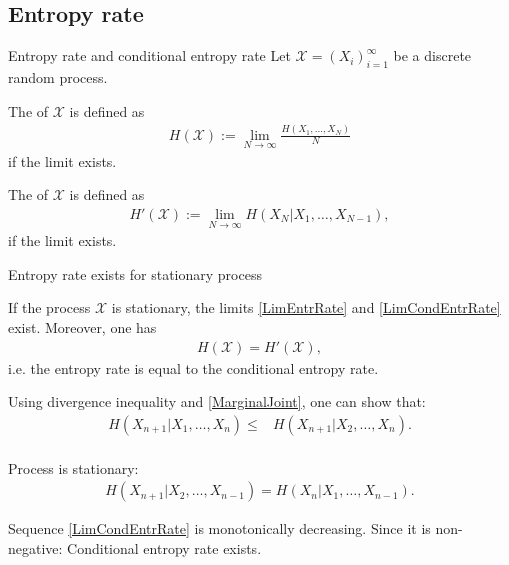 \subsection{Entropy rate}
\begin{frame}{Entropy rate and conditional entropy rate}
Let $\mathcal{X}=\left(X_i\right)_{i=1}^\infty$ be a discrete random process.
\bit
\item The   of $\mathcal{X}$ is 
defined as 
\begin{align}\label{LimEntrRate}
H(\mathcal{X}):=\lim_{N\to\infty}\frac{H\left(X_1,\dots,X_N\right)}{N}
\end{align}
if the limit exists.
\item The  of $\mathcal{X}$ is 
defined as 
\begin{align}\label{LimCondEntrRate}
H'(\mathcal{X}):=\lim_{N\to\infty}H\left(X_N|X_1,\dots,X_{N-1}\right),
\end{align}
if the limit exists.
\eit
\end{frame}

\begin{frame}{Entropy rate exists for stationary process}
\begin{theorem}
If the process $\mathcal{X}$ is stationary, the limits \eqref{LimEntrRate} and \eqref{LimCondEntrRate} exist. Moreover, one has
\begin{align*}
H(\mathcal{X})=H'(\mathcal{X}),
\end{align*}
i.e. the entropy rate is equal to the conditional entropy rate.
\end{theorem}
\bit
\item Using divergence inequality and \eqref{MarginalJoint}, one can show that: 
\begin{align*}
H(X_{n+1}|X_1,\dots,X_n)\leq &H(X_{n+1}|X_2,\dots,X_{n}).\\
\end{align*}
\item Process is stationary: 
\begin{align*}
H(X_{n+1}|X_2,\dots,X_{n-1})=H(X_{n}|X_1,\dots,X_{n-1}).
\end{align*}
\item [\iarrow] Sequence \eqref{LimCondEntrRate} is monotonically decreasing. Since it is non-negative: Conditional entropy rate exists. 
\eit
\end{frame}


